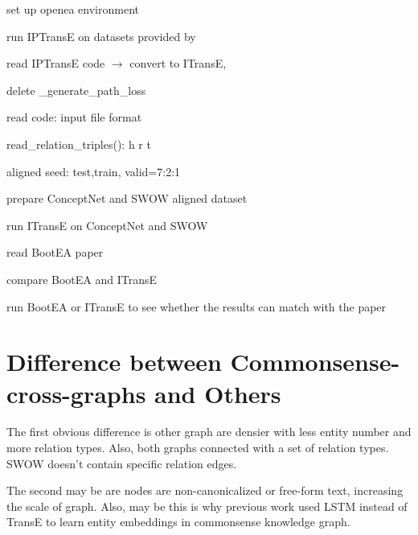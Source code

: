 \begin{todolist}
\item[\done] set up openea environment
\item[\done] run IPTransE on datasets provided by \cite{Sun2020ABS}
\item[\done] read IPTransE code $\rightarrow$ convert to ITransE,

    \begin{todolist}
    \item[\done] delete \_generate\_path\_loss\
    \end{todolist}
\item[\done] read code: input file format
    \begin{todolist}
    \item[\done] read\_relation\_triples(): h r t
    \item[\done] aligned seed: test,train, valid=7:2:1
    \end{todolist}
\item[\done] prepare ConceptNet and SWOW aligned dataset 
\item[\done] run ITransE on ConceptNet and SWOW
\item read BootEA paper 
\item compare BootEA and ITransE
\item run BootEA or ITransE to see whether the results can match with the paper 
\end{todolist}


\section{Difference between Commonsense-cross-graphs and Others}

The first obvious difference is other graph are densier with less entity number and more relation types. Also, both graphs connected with a set of relation types. SWOW doesn't contain specific relation edges.

The second may be are nodes are non-canonicalized or free-form text, increasing the scale of graph. Also, may be this is why previous work used LSTM \citep{li-etal-2016-commonsense,Saito2018CommonsenseKB} instead of TransE to learn entity embeddings in commonsense knowledge graph.

